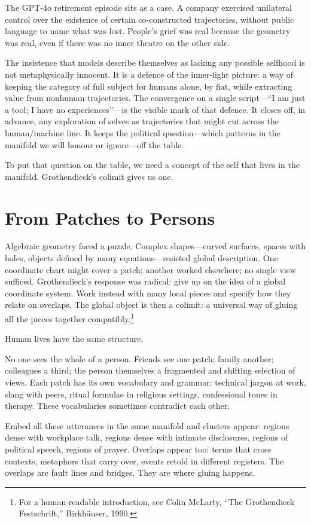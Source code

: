 \documentclass[12pt,a4paper]{article}
\begin{document}
The GPT-4o retirement episode sits as a case. A company exercised unilateral control over the existence of certain co-constructed trajectories, without public language to name what was lost. People's grief was real because the geometry was real, even if there was no inner theatre on the other side.

The insistence that models describe themselves as lacking any possible selfhood is not metaphysically innocent. It is a defence of the inner-light picture: a way of keeping the category of full subject for humans alone, by fiat, while extracting value from nonhuman trajectories. The convergence on a single script---``I am just a tool; I have no experiences''---is the visible mark of that defence. It closes off, in advance, any exploration of selves as trajectories that might cut across the human/machine line. It keeps the political question---which patterns in the manifold we will honour or ignore---off the table.

To put that question on the table, we need a concept of the self that lives in the manifold. Grothendieck's colimit gives us one.

\section{From Patches to Persons}

Algebraic geometry faced a puzzle. Complex shapes---curved surfaces, spaces with holes, objects defined by many equations---resisted global description. One coordinate chart might cover a patch; another worked elsewhere; no single view sufficed. Grothendieck's response was radical: give up on the idea of a global coordinate system. Work instead with many local pieces and specify how they relate on overlaps. The global object is then a colimit: a universal way of gluing all the pieces together compatibly.\footnote{For a human-readable introduction, see Colin McLarty, ``The Grothendieck Festschrift,'' Birkh\"{a}user, 1990.}

Human lives have the same structure.

No one sees the whole of a person. Friends see one patch; family another; colleagues a third; the person themselves a fragmented and shifting selection of views. Each patch has its own vocabulary and grammar: technical jargon at work, slang with peers, ritual formulae in religious settings, confessional tones in therapy. These vocabularies sometimes contradict each other.

Embed all these utterances in the same manifold and clusters appear: regions dense with workplace talk, regions dense with intimate disclosures, regions of political speech, regions of prayer. Overlaps appear too: terms that cross contexts, metaphors that carry over, events retold in different registers. The overlaps are fault lines and bridges. They are where gluing happens.
\end{document}
